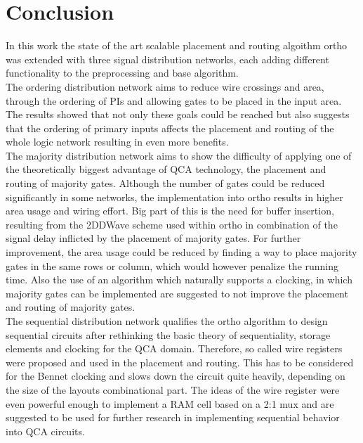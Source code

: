 \chapter{Conclusion}

In this work the state of the art scalable placement and routing algoithm ortho was extended with three signal distribution networks, each adding different functionality to the preprocessing and base algorithm.\\
The ordering distribution network aims to reduce wire crossings and area, through the ordering of PIs and allowing gates to be placed in the input area. The results showed that not only these goals could be reached but also suggests that the ordering of primary inputs affects the placement and routing of the whole logic network resulting in even more benefits.\\
The majority distribution network aims to show the difficulty of applying one of the theoretically biggest advantage of QCA technology, the placement and routing of majority gates. Although the number of gates could be reduced significantly in some networks, the implementation into ortho results in higher area usage and wiring effort. Big part of this is the need for buffer insertion, resulting from the 2DDWave scheme used within ortho in combination of the signal delay inflicted by the placement of majority gates. For further improvement, the area usage could be reduced by finding a way to place majority gates in the same rows or column, which would however penalize the running time. Also the use of an algorithm which naturally supports a clocking, in which majority gates can be implemented are suggested to not improve the placement and routing of majority gates.\\
The sequential distribution network qualifies the ortho algorithm to design sequential circuits after rethinking the basic theory of sequentiality, storage elements and clocking for the QCA domain. Therefore, so called wire registers were proposed and used in the placement and routing. This has to be considered for the Bennet clocking and slows down the circuit quite heavily, depending on the size of the layouts combinational part. The ideas of the wire register were even powerful enough to implement a RAM cell based on a 2:1 mux and are suggested to be used for further research in implementing sequential behavior into QCA circuits.